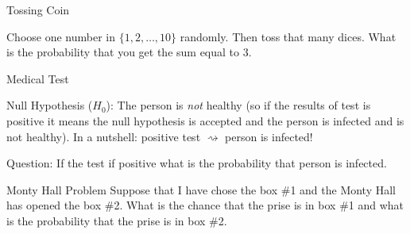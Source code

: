 \begin{example}{Tossing Coin}

Choose one number in $\{1,2,\ldots,10\}$ randomly. Then toss that many dices. What is the probability that you get the sum equal to 3.

\end{example}

\begin{example}{Medical Test}

Null Hypothesis ($H_0$): The person is \emph{not} healthy (so if the results of test is positive it means the null hypothesis is accepted and the person is infected and is not healthy). In a nutshell: positive test $\rightsquigarrow$ person is infected!

Question: If the test if positive what is the probability that person is infected.
\end{example}

\begin{example}{Monty Hall Problem}
Suppose that I have chose the box \#1 and the Monty Hall has opened the box \#2. What is the chance that the prise is in box \#1 and what is the probability that the prise is in box \#2. 
\end{example}
